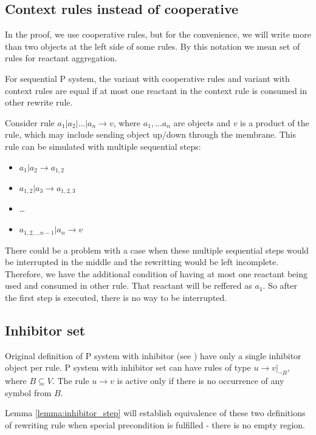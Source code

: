 \subsection{Context rules instead of cooperative}
  In the proof, we use cooperative rules, but for the convenience, we will write more than two objects at the left side of some rules. By this notation we mean set of rules for reactant aggregation.
  \begin{lema}
  \label{lemma:context_rules}
    For sequential P system, the variant with cooperative rules and variant with context rules are equal if at most one reactant in the context rule is consumed in other rewrite rule.
  \end{lema}
  \begin{dokaz}
    Consider rule $a_1|a_2|\dots|a_n \rightarrow v$, where $a_1,\dots a_n$ are objects and $v$ is a product of the rule, which may include sending object up/down through the membrane.
    This rule can be simulated with multiple sequential steps:
    \begin{itemize}
      \item $a_1|a_2 \rightarrow a_{1,2}$
      \item $a_{1,2}|a_3 \rightarrow a_{1,2,3}$
      \item \dots
      \item $a_{1,2,\dots n-1}|a_n \rightarrow v$
    \end{itemize}    
  \end{dokaz}
  There could be a problem with a case when these multiple sequential steps would be interrupted in the middle and the rewritting would be left incomplete. Therefore, we have the additional condition of having at most one reactant being used and consumed in other rule. That reactant will be reffered as $a_1$. So after the first step is executed, there is no way to be interrupted.

\subsection{Inhibitor set}
Original definition of P system with inhibitor (see \cite{Ionescu:jucs_10_5:on_p_systems_with}) have only a single inhibitor object per rule. P system with inhibitor set can have rules of type $u\rightarrow v|_{\neg B}$, where $B\subseteq V$. The rule $u\rightarrow v$ is active only if there is no occurrence of any symbol from $B$.

Lemma \ref{lemma:inhibitor_step} will establish equivalence of these two definitions of rewriting rule when special precondition is fulfilled - there is no empty region.

